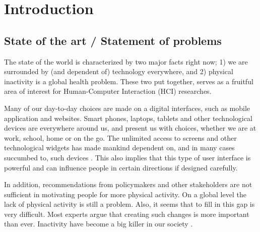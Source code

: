 \chapter{Introduction} 


\section{State of the art / Statement of problems}

The state of the world is characterized by two major facts right now; 1) we are surrounded by (and dependent of) technology everywhere, and 2) physical inactivity is a global health problem. These two put together, serves as a fruitful area of interest for Human-Computer Interaction (HCI) researches. 

Many of our day-to-day choices are made on a digital interfaces, such as mobile application and websites. Smart phones, laptops, tablets and other technological devices are everywhere around us, and present us with choices, whether we are at work, school, home or on the go. The unlimited access to screens and other technological widgets has made mankind dependent on, and in many cases succumbed to, such devices \cite{mirsch_digital_2017}.
This also implies that this type of user interface is powerful and can influence people in certain directions if designed carefully. 

In addition, recommendations from policymakers and other stakeholders are not sufficient in motivating people for more physical activity. On a global level the lack of physical activity is still a problem. Also, it seems that to fill in this gap is very difficult. Most experts argue that creating such changes is more important than ever. Inactivity have become a big killer in our society \cite{kohl_pandemic_2012}.

